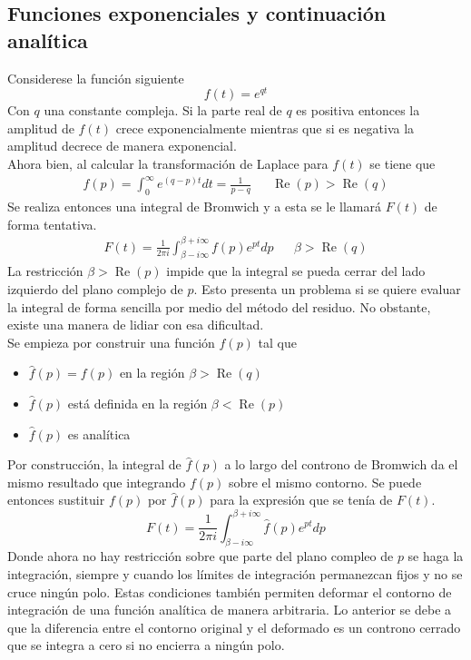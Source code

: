 \documentclass[../tesis_main_file.tex]{subfiles}
\begin{document}
\subsection{Funciones exponenciales y continuación analítica}
Considerese la función siguiente
\begin{equation}
f(t) = e^{qt}
\end{equation}
Con $q$ una constante compleja. Si la parte real de $q$ es positiva entonces la amplitud de $f(t)$ crece exponencialmente mientras que si es negativa la amplitud decrece de manera exponencial.\\
Ahora bien, al calcular la transformación de Laplace para $f(t)$ se tiene que
\begin{align}
\label{Ap-eq:fp_original}
f(p) = \int ^{\infty}_0 e^{(q-p)t}dt = \frac{1}{p-q} && \operatorname{Re}(p) > \operatorname{Re}(q)
\end{align}
Se realiza entonces una integral de Bromwich y a esta se le llamará $F(t)$ de forma tentativa.
\begin{align}
F(t) =\frac{1}{2\pi i}\int ^{\beta + i \infty}_{\beta - i\infty}f(p)e^{pt}dp && \beta > \operatorname{Re}(q)
\end{align}
La restricción $\beta > \operatorname{Re}(p)$ impide que la integral se pueda cerrar del lado izquierdo del plano complejo de $p$. Esto presenta un problema si se quiere evaluar la integral de forma sencilla por medio del método del residuo. No obstante, existe una manera de lidiar con esa dificultad.\\
Se empieza por construir una función $\widehat{f}(p)$ tal que
\begin{itemize}
\item $\widehat{f}(p) = f(p)$ en la región $\beta > \operatorname{Re}(q)$
\item $\widehat{f}(p)$ está definida en la región $\beta < \operatorname{Re}(p)$
\item $\widehat{f}(p)$ es analítica
\end{itemize}
Por construcción, la integral de $\widehat{f}(p)$ a lo largo del controno de Bromwich da el mismo resultado que integrando $f(p)$ sobre el mismo contorno. Se puede entonces sustituir $f(p)$ por $\widehat{f}(p)$ para la expresión que se tenía de $F(t)$.
\begin{equation}
F(t) =\frac{1}{2\pi i}\int ^{\beta + i \infty}_{\beta - i\infty}\widehat{f}(p)e^{pt}dp 
\end{equation}
Donde ahora no hay restricción sobre que parte del plano compleo de $p$ se haga la integración, siempre y cuando los límites de integración permanezcan fijos y no se cruce ningún polo. Estas condiciones también permiten deformar el contorno de integración de una función analítica de manera arbitraria. Lo anterior se debe a que la diferencia entre el contorno original y el deformado es un controno cerrado que se integra a cero si no encierra a ningún polo. \cite{bellan2008fundamentals}\\
\end{document}
